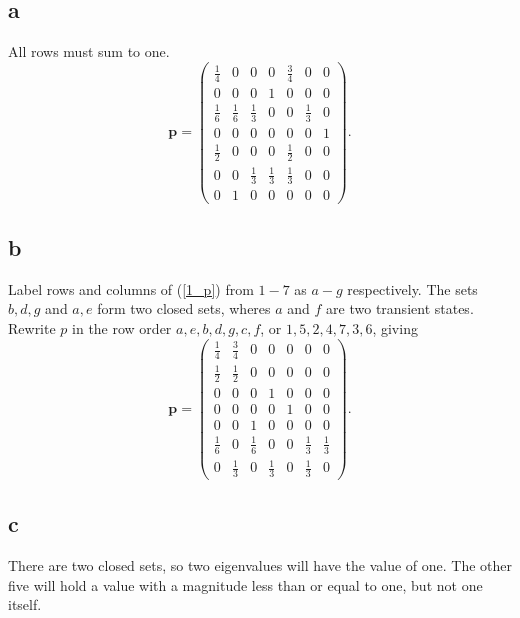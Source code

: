 \documentclass{article}
\begin{document}
\subsection{a}
All rows must sum to one.
\begin{equation}
    \mathbf{p} = \begin{pmatrix}
    \frac{1}{4} & 0 & 0 & 0 & \frac{3}{4} & 0 & 0 \\
    0 & 0 & 0 & 1 & 0 & 0 & 0 \\
    \frac{1}{6} & \frac{1}{6} & \frac{1}{3} & 0 & 0 & \frac{1}{3} & 0 \\
    0 & 0 & 0 & 0 & 0 & 0 & 1 \\
    \frac{1}{2} & 0 & 0 & 0 & \frac{1}{2}& 0 & 0 \\
    0 & 0 & \frac{1}{3} & \frac{1}{3} & \frac{1}{3} & 0 & 0 \\
    0 & 1 & 0 & 0 & 0 & 0 & 0
    \end{pmatrix}. \label{1_p}
\end{equation}

\subsection{b}
Label rows and columns of (\ref{1_p}) from $1-7$ as $a-g$ respectively. The sets ${b,d,g}$ and ${a,e}$ form two closed sets, wheres $a$ and $f$ are two transient states. Rewrite $p$ in the row order ${a,e,b,d,g,c,f}$, or ${1,5,2,4,7,3,6}$, giving
\begin{equation}
    \mathbf{p} = \begin{pmatrix}
    \frac{1}{4} & \frac{3}{4} & 0 & 0 & 0 & 0 & 0 \\
    \frac{1}{2} & \frac{1}{2} & 0 & 0 & 0 & 0 & 0 \\
    0 & 0 & 0 & 1 & 0 & 0 & 0 \\
    0 & 0 & 0 & 0 & 1 & 0 & 0 \\
    0 & 0 & 1 & 0 & 0 & 0 & 0 \\
    \frac{1}{6} & 0 & \frac{1}{6} & 0 & 0 & \frac{1}{3} & \frac{1}{3} \\
    0 & \frac{1}{3} & 0 & \frac{1}{3} & 0 & \frac{1}{3} & 0
    \end{pmatrix}. \label{1_p_1}
\end{equation}

\subsection{c}
There are two closed sets, so two eigenvalues will have the value of one. The other five will hold a value with a magnitude less than or equal to one, but not one itself.
\end{document}
